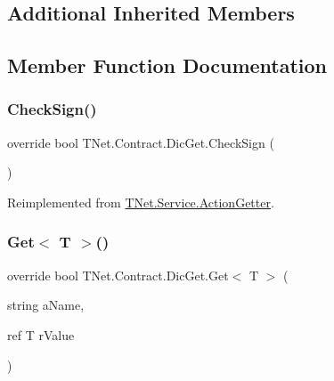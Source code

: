 \subsection*{Additional Inherited Members}


\subsection{Member Function Documentation}
\mbox{\label{class_t_net_1_1_contract_1_1_dic_get_a8e88c8fa7eb83c4596a9cff5ac438281}} 
\subsubsection{\texorpdfstring{Check\+Sign()}{CheckSign()}}
{\footnotesize\ttfamily override bool T\+Net.\+Contract.\+Dic\+Get.\+Check\+Sign (\begin{DoxyParamCaption}{ }\end{DoxyParamCaption})\hspace{0.3cm}{\ttfamily [virtual]}}







Reimplemented from \mbox{\hyperlink{class_t_net_1_1_service_1_1_action_getter_afd79de3801d7a69f32ba85c62f45a774}{T\+Net.\+Service.\+Action\+Getter}}.

\mbox{\label{class_t_net_1_1_contract_1_1_dic_get_a606c222e0ea4d6e26cb982db25395419}} 
\subsubsection{\texorpdfstring{Get$<$ T $>$()}{Get< T >()}}
{\footnotesize\ttfamily override bool T\+Net.\+Contract.\+Dic\+Get.\+Get$<$ T $>$ (\begin{DoxyParamCaption}\item[{string}]{a\+Name,  }\item[{ref T}]{r\+Value }\end{DoxyParamCaption})\hspace{0.3cm}{\ttfamily [virtual]}}







